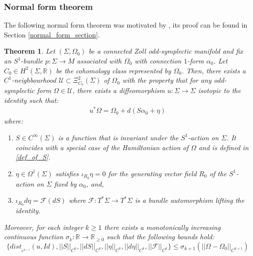 \documentclass[11pt]{amsart}
\theoremstyle{plain}
\newtheorem{theorem}{Theorem}[section]
\theoremstyle{definition}
\theoremstyle{remark}
\begin{document}
\subsubsection{Normal form theorem}
The following normal form theorem was motivated by \cite[Theorem 2]{Abbondandolo-Benedetti}, its proof can be found in Section \ref{normal_form_section}.
\begin{theorem}\label{normalformthm}
Let $(\Sigma, \Omega_0)$ be a connected Zoll odd-symplectic manifold and fix an $S^1$-bundle $p: \Sigma \rightarrow M$ associated with $\Omega_0$ with connection $1$-form $\alpha_0$. Let $C_0 \in H^2(\Sigma,\mathbb{R})$ be the cohomology class represented by $\Omega_0$. Then, there exists a $C^1$-neighbourhood $\mathcal{U} \subset \Xi_{C_0}^2(\Sigma)$ of $\Omega_0$ with the property that for any odd-symplectic form $\Omega \in \mathcal{U}$, there exists a diffeomorphism $u: \Sigma \rightarrow \Sigma$ isotopic to the identity such that:
\begin{align}\label{normal_form_odd_symp}
    u^* \Omega = \Omega_0 + d(S\alpha_0 + \eta )
\end{align}
where:
\begin{enumerate}
    \item $S\in C^{\infty}(\Sigma)$ is a function that is invariant under the $S^1$-action on $\Sigma$. It coincides with a special case of the Hamiltonian action of $\Omega$ and is defined in \eqref{def_of_S}.
    
    \item $\eta \in \Omega^1(\Sigma)$ satisfies $\iota _{R_0} \eta =0$ for the generating vector field $R_0$ of the $S^1$-action on $\Sigma$ fixed by $\alpha_0$, and,
    
    \item $\iota _{R_0} d\eta = \mathcal{F}(dS)$ where $\mathcal{F}: T^*\Sigma \rightarrow T^*\Sigma$ is a bundle automorphism lifting the identity. 
\end{enumerate}
Moreover, for each integer $k\geq 1$ there exists a monotonically increasing continuous function $\sigma_k: \mathbb{R} \rightarrow \mathbb{R}_{\geq 0}$ such that the following bounds hold:
\begin{equation}\label{bounds_odd_symp}
    \Big\{ dist_{_{C^{k+1}}}(u, Id),  \vert\vert S \vert\vert_{C^{k}}, \vert\vert dS\vert\vert_{C^k}, \vert\vert\eta\vert\vert_{C^{k}},  \vert\vert d\eta\vert\vert_{C^{k}}, \vert\vert\mathcal{F}\vert\vert_{C^k} \Big\} \leq \sigma_{k+1}(\vert\vert\Omega -\Omega_0\vert\vert_{C^{k+1}})
\end{equation}
\end{theorem}
\end{document}
